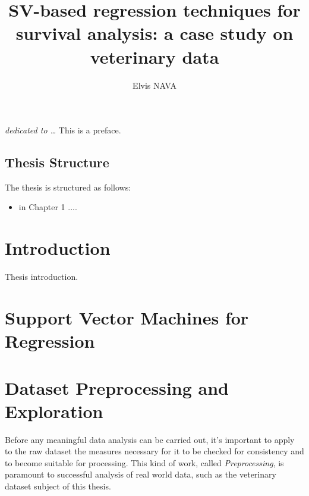 \documentclass[12pt]{report}
\begin{document}
\title{SV-based regression techniques for survival analysis: a case study on veterinary data}
\author{Elvis NAVA}
%
% 
%
\beforepreface
\prefacesection{}
        {\hfill \Large {\sl dedicated to \dots}}
% 
%
This is a preface.
%
%
\section*{Thesis Structure}
\label{structure}
The thesis is structured as follows:
\begin{itemize}
\item in Chapter 1 ....
\end{itemize}
%
%
% 

\chapter*{Introduction}
\label{intro}
Thesis introduction.

% 
%
\chapter{Support Vector Machines for Regression}
\label{ch1}

\chapter{Dataset Preprocessing and Exploration}
\label{ch2}
Before any meaningful data analysis can be carried out, it's important to apply to the raw dataset the measures necessary for it to be checked for consistency and to become suitable for processing. This kind of work, called \textit{Preprocessing}, is paramount to successful analysis of real world data, such as the veterinary dataset subject of this thesis.
\end{document}
